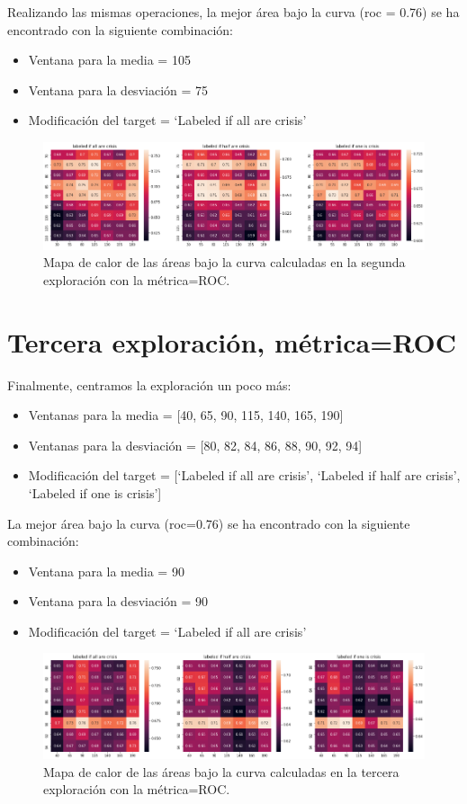 \documentclass[a4paper,12pt,twoside,oldfontcommands]{memoir}
\begin{document}
Realizando las mismas operaciones, la mejor área bajo la curva (roc = 0.76) se ha encontrado con la siguiente combinación: 
\begin{itemize}
    \item Ventana para la media = 105
    \item Ventana para la desviación = 75
    \item Modificación del target = `Labeled if all are crisis'
\end{itemize}

\begin{figure}
    \centering
    \includegraphics[width=1\textwidth]{images/heatmap2.png}
    \caption{Mapa de calor de las áreas bajo la curva calculadas en la segunda exploración con la métrica=ROC.}
    \label{fig:heatmap2}
\end{figure}

\section{Tercera exploración, métrica=ROC}
Finalmente, centramos la exploración un poco más: 
\begin{itemize}
    \item Ventanas para la media = [40, 65, 90, 115, 140, 165, 190]
    \item Ventanas para la desviación = [80, 82, 84, 86, 88, 90, 92, 94]
    \item Modificación del target = [`Labeled if all are crisis', `Labeled if half are crisis', `Labeled if one is crisis']
\end{itemize}

La mejor área bajo la curva (roc=0.76) se ha encontrado con la siguiente combinación: 
\begin{itemize}
    \item Ventana para la media = 90
    \item Ventana para la desviación = 90
    \item Modificación del target = `Labeled if all are crisis'
\end{itemize}

\begin{figure}
    \centering
    \includegraphics[width=1\textwidth]{images/heatmap3.png}
    \caption{Mapa de calor de las áreas bajo la curva calculadas en la tercera exploración con la métrica=ROC.}
    \label{fig:heatmap3}
\end{figure}
\end{document}
